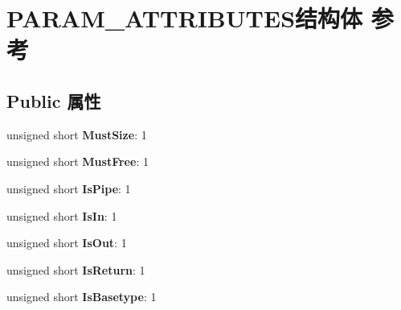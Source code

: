 \hypertarget{struct_p_a_r_a_m___a_t_t_r_i_b_u_t_e_s}{}\section{P\+A\+R\+A\+M\+\_\+\+A\+T\+T\+R\+I\+B\+U\+T\+E\+S结构体 参考}
\label{struct_p_a_r_a_m___a_t_t_r_i_b_u_t_e_s}
\subsection*{Public 属性}
\begin{DoxyCompactItemize}
\item 
\mbox{\label{struct_p_a_r_a_m___a_t_t_r_i_b_u_t_e_s_ae4b0fad6ad8f28f46a262052543e3a73}} 
unsigned short {\bfseries Must\+Size}\+: 1
\item 
\mbox{\label{struct_p_a_r_a_m___a_t_t_r_i_b_u_t_e_s_a79fb4662b8ca82dff2db656c1292e347}} 
unsigned short {\bfseries Must\+Free}\+: 1
\item 
\mbox{\label{struct_p_a_r_a_m___a_t_t_r_i_b_u_t_e_s_a658b50e05a1f3e7dc7addf4abbb893d2}} 
unsigned short {\bfseries Is\+Pipe}\+: 1
\item 
\mbox{\label{struct_p_a_r_a_m___a_t_t_r_i_b_u_t_e_s_ad855aa09cd07744705a23d4b3dff036d}} 
unsigned short {\bfseries Is\+In}\+: 1
\item 
\mbox{\label{struct_p_a_r_a_m___a_t_t_r_i_b_u_t_e_s_a8bb42d792f6c89982175e439e5ef6889}} 
unsigned short {\bfseries Is\+Out}\+: 1
\item 
\mbox{\label{struct_p_a_r_a_m___a_t_t_r_i_b_u_t_e_s_a0f3e420e96cc336df8b6fd6c89d4288c}} 
unsigned short {\bfseries Is\+Return}\+: 1
\item 
\mbox{\label{struct_p_a_r_a_m___a_t_t_r_i_b_u_t_e_s_ab109ca32a6e7ba6b74824e4d17804059}} 
unsigned short {\bfseries Is\+Basetype}\+: 1
\item 
\mbox{\label{struct_p_a_r_a_m___a_t_t_r_i_b_u_t_e_s_aec15e1e1c143fd7bd8e92812b6c2d157}} 

\end{DoxyCompactItemize}
